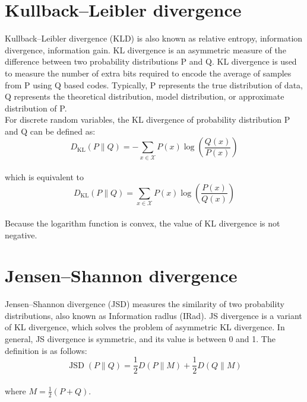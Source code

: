 \documentclass[11pt,a4paper]{article}
\begin{document}
\newpage


\newpage
\appendix
\section{Kullback–Leibler divergence}
Kullback–Leibler divergence (KLD) is also known as relative entropy, information divergence, information gain. KL divergence is an asymmetric measure of the difference between two probability distributions P and Q. KL divergence is used to measure the number of extra bits required to encode the average of samples from P using Q based codes. Typically, P represents the true distribution of data, Q represents the theoretical distribution, model distribution, or approximate distribution of P.
\\
\newline
For discrete random variables, the KL divergence of probability distribution P and Q can be defined as:
\\
$$
D_{\mathrm{KL}}(P \| Q)=-\sum_{x \in \mathcal{X}} P(x) \log \left(\frac{Q(x)}{P(x)}\right)
$$
\\
which is equivalent to
$$
D_{\mathrm{KL}}(P \| Q)=\sum_{x \in \mathcal{X}} P(x) \log \left(\frac{P(x)}{Q(x)}\right)
$$
\\
Because the logarithm function is convex, the value of KL divergence is not negative\citep{cover2012elements}.
\section{Jensen–Shannon divergence}
Jensen–Shannon divergence (JSD) measures the similarity of two probability distributions, also known as Information radlus (IRad). JS divergence is a variant of KL divergence, which solves the problem of asymmetric KL divergence. In general, JS divergence is symmetric, and its value is between 0 and 1. The definition is as follows:
\\
$$
\operatorname{JSD}(P \| Q)=\frac{1}{2} D(P \| M)+\frac{1}{2} D(Q \| M)
$$
\\
where $
M=\frac{1}{2}(P+Q)
$\citep{cover2012elements}.
\end{document}
